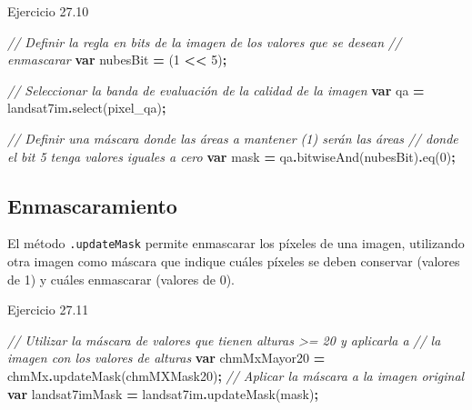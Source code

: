 \documentclass[
  12pt,
  letterpaper,
  twoside]{book}
\newenvironment{Shaded}{\begin{snugshade}}{\end{snugshade}}
\newcommand{\CommentTok}[1]{\textcolor[rgb]{0.56,0.35,0.01}{\textit{#1}}}
\newcommand{\DecValTok}[1]{\textcolor[rgb]{0.00,0.00,0.81}{#1}}
\newcommand{\FunctionTok}[1]{\textcolor[rgb]{0.00,0.00,0.00}{#1}}
\newcommand{\KeywordTok}[1]{\textcolor[rgb]{0.13,0.29,0.53}{\textbf{#1}}}
\newcommand{\NormalTok}[1]{#1}
\newcommand{\OperatorTok}[1]{\textcolor[rgb]{0.81,0.36,0.00}{\textbf{#1}}}
\newcommand{\StringTok}[1]{\textcolor[rgb]{0.31,0.60,0.02}{#1}}
\begin{document}
Ejercicio 27.10

\begin{Shaded}
\begin{Highlighting}[]
\CommentTok{// Definir la regla en bits de la imagen de los valores que se desean }
\CommentTok{// enmascarar}
\KeywordTok{var}\NormalTok{ nubesBit }\OperatorTok{=}\NormalTok{ (}\DecValTok{1} \OperatorTok{\textless{}\textless{}} \DecValTok{5}\NormalTok{)}\OperatorTok{;}

\CommentTok{// Seleccionar la banda de evaluación de la calidad de la imagen}
\KeywordTok{var}\NormalTok{ qa }\OperatorTok{=}\NormalTok{ landsat7im}\OperatorTok{.}\FunctionTok{select}\NormalTok{(}\StringTok{\textquotesingle{}pixel\_qa\textquotesingle{}}\NormalTok{)}\OperatorTok{;}

\CommentTok{// Definir una máscara donde las áreas a mantener (1) serán las áreas }
\CommentTok{// donde el bit 5 tenga valores iguales a cero}
\KeywordTok{var}\NormalTok{ mask }\OperatorTok{=}\NormalTok{ qa}\OperatorTok{.}\FunctionTok{bitwiseAnd}\NormalTok{(nubesBit)}\OperatorTok{.}\FunctionTok{eq}\NormalTok{(}\DecValTok{0}\NormalTok{)}\OperatorTok{;}
\end{Highlighting}
\end{Shaded}

\hypertarget{enmascaramiento}{%
\subsection{Enmascaramiento}\label{enmascaramiento}}

El método \texttt{.updateMask} permite enmascarar los píxeles de una imagen, utilizando otra imagen como máscara que indique cuáles píxeles se deben conservar (valores de 1) y cuáles enmascarar (valores de 0).

Ejercicio 27.11

\begin{Shaded}
\begin{Highlighting}[]
\CommentTok{// Utilizar la máscara de valores que tienen alturas \textgreater{}= 20 y aplicarla a }
\CommentTok{// la imagen con los valores de alturas}
\KeywordTok{var}\NormalTok{ chmMxMayor20 }\OperatorTok{=}\NormalTok{ chmMx}\OperatorTok{.}\FunctionTok{updateMask}\NormalTok{(chmMXMask20)}\OperatorTok{;}
\CommentTok{// Aplicar la máscara a la imagen original}
\KeywordTok{var}\NormalTok{ landsat7imMask }\OperatorTok{=}\NormalTok{ landsat7im}\OperatorTok{.}\FunctionTok{updateMask}\NormalTok{(mask)}\OperatorTok{;}
\end{Highlighting}
\end{Shaded}
\end{document}
